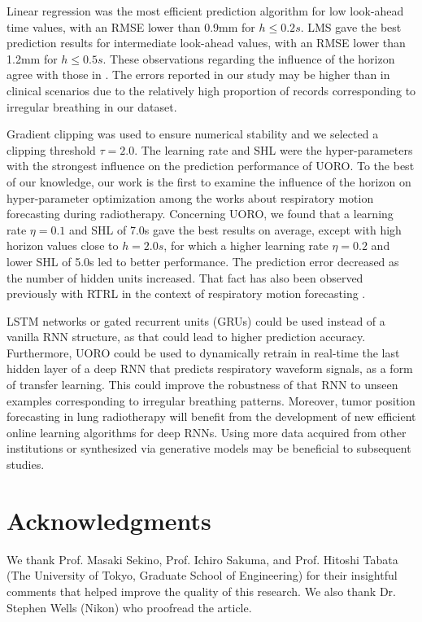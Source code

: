 \documentclass[twocolumn,a4paper]{svjour3} \sloppy          \smartqed
\begin{document}
Linear regression was the most efficient prediction algorithm for low look-ahead time values, with an RMSE lower than 0.9mm for $h \leq 0.2s$. LMS gave the best prediction results for intermediate look-ahead values, with an RMSE lower than 1.2mm for $h \leq 0.5s$. These observations regarding the influence of the horizon agree with those in \cite{verma2010survey}. The errors reported in our study may be higher than in clinical scenarios due to the relatively high proportion of records corresponding to irregular breathing in our dataset.

Gradient clipping was used to ensure numerical stability and we selected a clipping threshold $\tau = 2.0$. The learning rate and SHL were the hyper-parameters with the strongest influence on the prediction performance of UORO. To the best of our knowledge, our work is the first to examine the influence of the horizon on hyper-parameter optimization among the works about respiratory motion forecasting during radiotherapy. Concerning UORO, we found that a learning rate  $\eta=0.1$ and SHL of 7.0s gave the best results on average, except with high horizon values close to $h=2.0s$, for which a higher learning rate $\eta=0.2$ and lower SHL of 5.0s led to better performance. The prediction error decreased as the number of hidden units increased. That fact has also been observed previously with RTRL in the context of respiratory motion forecasting \cite{POHL2021101941}. 

LSTM networks or gated recurrent units (GRUs) could be used instead of a vanilla RNN structure, as that could lead to higher prediction accuracy. Furthermore, UORO could be used to dynamically retrain in real-time the last hidden layer of a deep RNN that predicts respiratory waveform signals, as a form of transfer learning. This could improve the robustness of that RNN to unseen examples corresponding to irregular breathing patterns. Moreover, tumor position forecasting in lung radiotherapy will benefit from the development of new efficient online learning algorithms for deep RNNs. Using more data acquired from other institutions or synthesized via generative models \cite{pastor2021semi} may be beneficial to subsequent studies. 




\section*{Acknowledgments}

We thank Prof. Masaki Sekino, Prof. Ichiro Sakuma, and Prof. Hitoshi Tabata (The University of Tokyo, Graduate School of Engineering) for their insightful comments that helped improve the quality of this research. We also thank Dr. Stephen Wells (Nikon) who proofread the article. 
\end{document}

